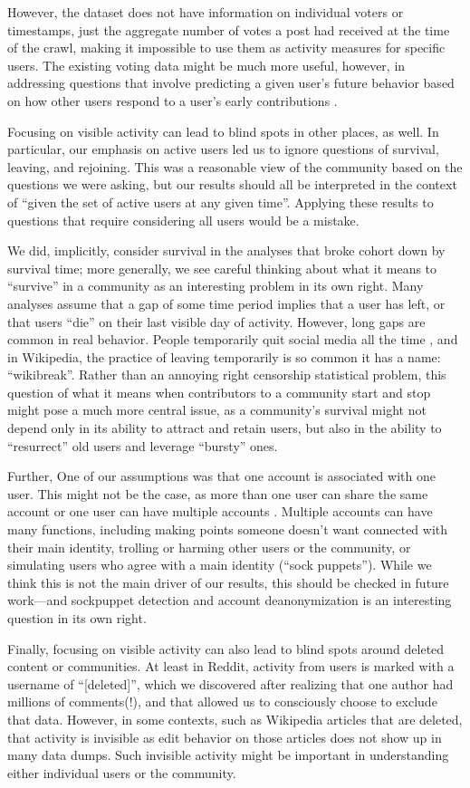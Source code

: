 However, the dataset does not have information on individual voters or timestamps, just the aggregate number of votes a post had received at the time of the crawl, making it impossible to use them as activity measures for specific users.  The existing voting data might be much more useful, however, in addressing questions that involve predicting a given user's future behavior based on how other users respond to a user's early contributions \cite{Joyce2006,Sarkar2012}.

Focusing on visible activity can lead to blind spots in other places, as well.  In particular, our emphasis on active users led us to ignore questions of survival, leaving, and rejoining.  This was a reasonable view of the community based on the questions we were asking, but our results should all be interpreted in the context of ``given the set of active users at any given time''.  Applying these results to questions that require considering all users would be a mistake.  

We did, implicitly, consider survival in the analyses that broke cohort down by survival time; more generally, we see careful thinking about what it means to ``survive'' in a community as an interesting problem in its own right.  Many analyses assume that a gap of some time period implies that a user has left, or that users ``die'' on their last visible day of activity.  However, long gaps are common in real behavior.  People temporarily quit social media all the time \cite{Baumer2013}, and in Wikipedia, the practice of leaving temporarily is so common it has a name: ``wikibreak''.    Rather than an annoying right censorship statistical problem, this question of what it means when contributors to a community start and stop might pose a much more central issue, as a community's survival might not depend only in its ability to attract and retain users, but also in the ability to ``resurrect'' old users and leverage ``bursty'' ones.

Further, One of our assumptions was that one account is associated with one user. This might not be the case, as more than one user can share the same account \cite{Lampinen2014} or one user can have multiple accounts \cite{Bergstrom2011}.  Multiple accounts can have many functions, including making points someone doesn't want connected with their main identity, trolling or harming other users or the community, or simulating users who agree with a main identity (``sock puppets'').  While we think this is not the main driver of our results, this should be checked in future work---and sockpuppet detection and account deanonymization is an interesting question in its own right.

Finally, focusing on visible activity can also lead to blind spots around deleted content or communities.  At least in Reddit, activity from users is marked with a username of ``[deleted]'', which we discovered after realizing that one author had millions of comments(!), and that allowed us to consciously choose to exclude that data.  However, in some contexts, such as Wikipedia articles that are deleted, that activity is invisible as edit behavior on those articles does not show up in many data dumps.  Such invisible activity might be important in understanding either individual users or the community. 

